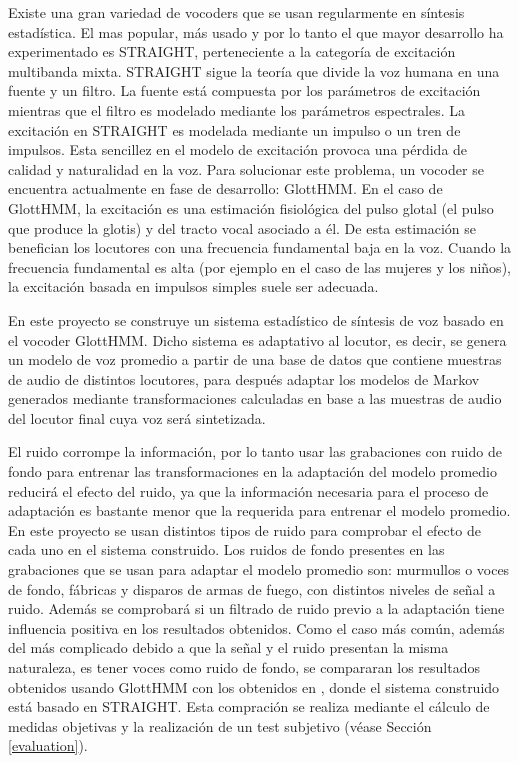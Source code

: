 \begin{resumencastellano}[english]
Existe una gran variedad de vocoders que se usan regularmente en s\'intesis estad\'istica.
%
El mas popular, m\'as usado y por lo tanto el que mayor desarrollo ha experimentado es STRAIGHT, perteneciente a la categor\'ia de excitaci\'on multibanda mixta.
%
STRAIGHT sigue la teor\'ia que divide la voz humana en una fuente y un filtro.
%
La fuente est\'a compuesta por los par\'ametros de excitaci\'on mientras que el filtro es modelado mediante los par\'ametros espectrales.
%
La excitaci\'on en STRAIGHT es modelada mediante un impulso o un tren de impulsos.
%
Esta sencillez en el modelo de excitaci\'on provoca una p\'erdida de calidad y naturalidad en la voz.
%
Para solucionar este problema, un vocoder se encuentra actualmente en fase de desarrollo: GlottHMM.
%
En el caso de GlottHMM, la excitaci\'on es una estimaci\'on fisiol\'ogica del pulso glotal (el pulso que produce la glotis) y del tracto vocal asociado a \'el.
%
De esta estimaci\'on se benefician los locutores con una frecuencia fundamental baja en la voz.
%
Cuando la frecuencia fundamental es alta (por ejemplo en el caso de las mujeres y los ni\~nos), la excitaci\'on basada en impulsos simples suele ser adecuada.

En este proyecto se construye un sistema estad\'istico de s\'intesis de voz basado en el vocoder GlottHMM.
%
Dicho sistema es adaptativo al locutor, es decir, se genera un modelo de voz promedio a partir de una base de datos que contiene muestras de audio de distintos locutores, para despu\'es adaptar los modelos de Markov generados mediante transformaciones calculadas en base a las muestras de audio del locutor final cuya voz ser\'a sintetizada.

El ruido corrompe la informaci\'on, por lo tanto usar las grabaciones con ruido de fondo para entrenar las transformaciones en la adaptaci\'on del modelo promedio reducir\'a el efecto del ruido, ya que la informaci\'on necesaria para el proceso de adaptaci\'on es bastante menor que la requerida para entrenar el modelo promedio.
%
En este proyecto se usan distintos tipos de ruido para comprobar el efecto de cada uno en el sistema construido.
%
Los ruidos de fondo presentes en las grabaciones que se usan para adaptar el modelo promedio son: murmullos o voces de fondo, f\'abricas y disparos de armas de fuego, con distintos niveles de se\~nal a ruido.
%
Adem\'as se comprobar\'a si un filtrado de ruido previo a la adaptaci\'on tiene influencia positiva en los resultados obtenidos.
%
Como el caso m\'as com\'un, adem\'as del m\'as complicado debido a que la se\~nal y el ruido presentan la misma naturaleza, es tener voces como ruido de fondo, se compararan los resultados obtenidos usando GlottHMM con los obtenidos en \cite{karhila_jstsp_14}, donde el sistema construido est\'a basado en STRAIGHT.
%
Esta compraci\'on se realiza mediante el c\'alculo de medidas objetivas y la realizaci\'on de un test subjetivo (v\'ease Secci\'on \ref{evaluation}).


\end{resumencastellano}
